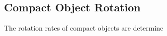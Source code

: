 {\color{orange}

\subsection{Compact Object Rotation}

The rotation rates of compact objects are determine

}